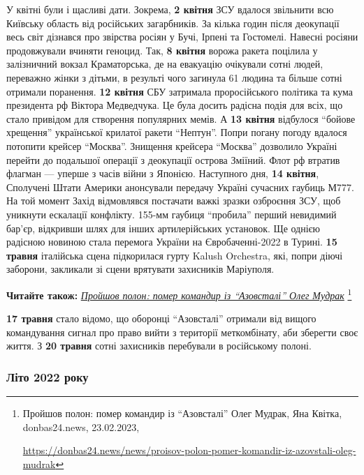 
У квітні були і щасливі дати. Зокрема, \textbf{2 квітня} ЗСУ вдалося звільнити всю
Київську область від російських загарбників. За кілька годин після деокупації
весь світ дізнався про звірства росіян у Бучі, Ірпені та Гостомелі. Навесні
росіяни продовжували вчиняти геноцид. Так, \textbf{8 квітня} ворожа ракета поцілила у
залізничний вокзал Краматорська, де на евакуацію очікували сотні людей,
переважно жінки з дітьми, в результі чого загинула 61 людина та більше сотні
отримали поранення. \textbf{12 квітня} СБУ затримала проросійського політика та кума
президента рф Віктора Медведчука. Це була досить радісна подія для всіх, що
стало привідом для створення популярних мемів. А \textbf{13 квітня} відбулося \enquote{бойове
хрещення} української крилатої ракети \enquote{Нептун}. Попри погану погоду вдалося
потопити крейсер \enquote{Москва}. Знищення крейсера \enquote{Москва} дозволило Україні перейти
до подальшої операції з деокупації острова Зміїний. Флот рф втратив флагман —
уперше з часів війни з Японією. Наступного дня, \textbf{14 квітня}, Сполучені Штати
Америки анонсували передачу Україні сучасних гаубиць М777. На той момент Захід
відмовлявся постачати важкі зразки озброєння ЗСУ, щоб уникнути ескалації
конфлікту. 155-мм гаубиця \enquote{пробила} перший невидимий бар'єр, відкривши шлях для
інших артилерійських установок. Ще однією радісною новиною стала перемога
України на Євробаченні-2022 в Турині. \textbf{15 травня} італійська сцена підкорилася
гурту Kalush Orchestra, які, попри діючі заборони, закликали зі сцени врятувати
захисників Маріуполя.

\textbf{Читайте також:} \href{https://donbas24.news/news/proisov-polon-pomer-komandir-iz-azovstali-oleg-mudrak}{\emph{Пройшов полон: помер командир із \enquote{Азовсталі} Олег Мудрак}}%
\footnote{Пройшов полон: помер командир із \enquote{Азовсталі} Олег Мудрак, Яна Квітка, donbas24.news, 23.02.2023, \par%
\url{https://donbas24.news/news/proisov-polon-pomer-komandir-iz-azovstali-oleg-mudrak}%
}


\textbf{17 травня} стало відомо, що оборонці \enquote{Азовсталі} отримали від
вищого командування сигнал про право вийти з території меткомбінату, аби
зберегти своє життя. З \textbf{20 травня} сотні захисників перебували в
російському полоні.

\subsubsection{Літо 2022 року}

